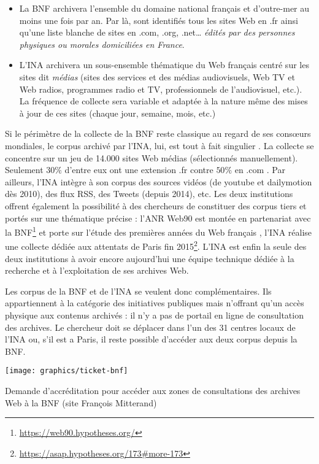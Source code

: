 \documentclass[symmetric,justified,marginals=raggedouter]{tufte-book}
\begin{document}
\begin{itemize}[leftmargin=*]  
\item La BNF archivera l'ensemble du domaine national français et d'outre-mer au moins une fois par an. Par là, sont identifiés tous les sites Web en .fr ainsi qu'une liste blanche de sites en .com, .org, .net\ldots{} \og\textit{édités par des personnes physiques ou morales domiciliées en France}\fg{}.
\item L'INA archivera un sous-ensemble thématique du Web français centré sur les sites dit \textit{médias} (sites des services et des médias audiovisuels, Web TV et Web radios, programmes radio et TV, professionnels de l'audiovisuel, etc.). La fréquence de collecte sera variable et adaptée à la nature même des mises à jour de ces sites (chaque jour, semaine, mois, etc.)
\end{itemize}

\noindent Si le périmètre de la collecte de la BNF reste classique au regard de ses consœurs mondiales, le corpus archivé par l'INA, lui, est tout à fait singulier \citep{mussou_et_2012}. La collecte se concentre sur un jeu de 14.000 sites Web médias (sélectionnés manuellement). Seulement $30\%$ d'entre eux ont une extension .fr contre $50\%$ en .com \citep{drugeon_technical_2005}. Par ailleurs, l'INA intègre à son corpus des sources vidéos (de youtube et dailymotion dès 2010), des flux RSS, des Tweets (depuis 2014), etc. Les deux institutions offrent également la possibilité à des chercheurs de constituer des corpus tiers et portés sur une thématique précise : l'ANR Web90 est montée en partenariat avec la BNF\footnote{\RaggedOuter \url{https://web90.hypotheses.org/}} et porte sur l'étude des premières années du Web français \citep{schafer_web_2016}, l'INA réalise une collecte dédiée aux attentats de Paris fin 2015\footnote{\RaggedOuter \url{https://asap.hypotheses.org/173\#more-173}}. L'INA est enfin la seule des deux institutions à avoir encore aujourd'hui une équipe technique dédiée à la recherche et à l'exploitation de ses archives Web.

Les corpus de la BNF et de l'INA se veulent donc complémentaires. Ils appartiennent à la catégorie des initiatives publiques mais n'offrant qu'un accès physique aux contenus archivés : il n'y a pas de portail en ligne de consultation des archives. Le chercheur doit se déplacer dans l'un des 31 centres locaux de l'INA ou, s'il est a Paris, il reste possible d'accéder aux deux corpus depuis la BNF.

\begin{marginfigure}%
  \texttt{[image: graphics/ticket-bnf]}
  \vspace*{0.2cm}  
  \caption{Demande d'accréditation pour accéder aux zones de consultations des archives Web à la BNF (site François Mitterand)}
  \label{fig:ticket-bnf}
\end{marginfigure} 
\end{document}
